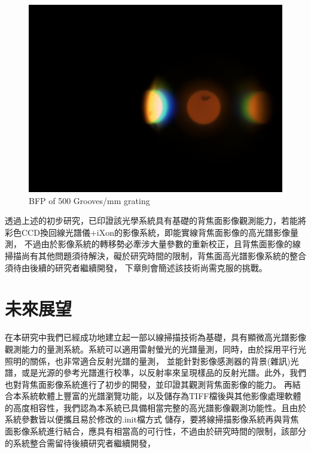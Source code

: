\documentclass[12pt]{article}
\begin{document}
\begin{figure}[h]
    \centering
    \includegraphics[width = 0.8\linewidth]{500bfp.jpeg}
    \caption{BFP of 500 Grooves/mm grating}
    \label{fig: 500 bfp}
\end{figure}

透過上述的初步研究，已印證該光學系統具有基礎的背焦面影像觀測能力，若能將彩色CCD換回線光譜儀+iXon的影像系統，即能實線背焦面影像的高光譜影像量測，
不過由於影像系統的轉移勢必牽涉大量參數的重新校正，且背焦面影像的線掃描尚有其他問題須待解決，礙於研究時間的限制，背焦面高光譜影像系統的整合須待由後續的研究者繼續開發，
下章則會簡述該技術尚需克服的挑戰。

\section{未來展望}
在本研究中我們已經成功地建立起一部以線掃描技術為基礎，具有顯微高光譜影像觀測能力的量測系統。系統可以適用雷射螢光的光譜量測，同時，由於採用平行光照明的關係，也非常適合反射光譜的量測，
並能針對影像感測器的背景(雜訊)光譜，或是光源的參考光譜進行校準，以反射率來呈現樣品的反射光譜。此外，我們也對背焦面影像系統進行了初步的開發，並印證其觀測背焦面影像的能力。
再結合本系統軟體上豐富的光譜瀏覽功能，以及儲存為TIFF檔後與其他影像處理軟體的高度相容性，我們認為本系統已具備相當完整的高光譜影像觀測功能性。且由於系統參數皆以便攜且易於修改的.init檔方式
儲存，要將線掃描影像系統再與背焦面影像系統進行結合，應具有相當高的可行性，不過由於研究時間的限制，該部分的系統整合需留待後續研究者繼續開發，
\end{document}
